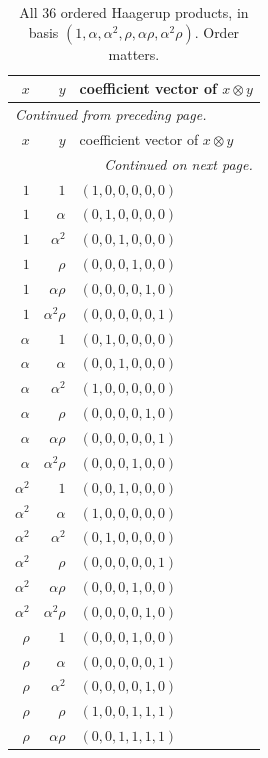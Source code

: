 \begingroup\small
\setlength{\tabcolsep}{5pt}
\begin{longtable}{rrl}
\caption{All 36 ordered Haagerup products, in basis $(1,\alpha,\alpha^2,\rho,\alpha\rho,\alpha^2\rho)$. Order matters.}\label{expphysics:h3-fusion}\\
\toprule
$x$ & $y$ & coefficient vector of $x\otimes y$\\
\midrule
\endfirsthead
\multicolumn{3}{l}{\small\itshape Continued from preceding page.}\\
\toprule
$x$ & $y$ & coefficient vector of $x\otimes y$\\
\midrule
\endhead
\midrule
\multicolumn{3}{r}{\small\itshape Continued on next page.}\\
\endfoot
\bottomrule
\endlastfoot
$1$ & $1$ & $(1,0,0,0,0,0)$\\
$1$ & $\alpha$ & $(0,1,0,0,0,0)$\\
$1$ & $\alpha^2$ & $(0,0,1,0,0,0)$\\
$1$ & $\rho$ & $(0,0,0,1,0,0)$\\
$1$ & $\alpha\rho$ & $(0,0,0,0,1,0)$\\
$1$ & $\alpha^2\rho$ & $(0,0,0,0,0,1)$\\
$\alpha$ & $1$ & $(0,1,0,0,0,0)$\\
$\alpha$ & $\alpha$ & $(0,0,1,0,0,0)$\\
$\alpha$ & $\alpha^2$ & $(1,0,0,0,0,0)$\\
$\alpha$ & $\rho$ & $(0,0,0,0,1,0)$\\
$\alpha$ & $\alpha\rho$ & $(0,0,0,0,0,1)$\\
$\alpha$ & $\alpha^2\rho$ & $(0,0,0,1,0,0)$\\
$\alpha^2$ & $1$ & $(0,0,1,0,0,0)$\\
$\alpha^2$ & $\alpha$ & $(1,0,0,0,0,0)$\\
$\alpha^2$ & $\alpha^2$ & $(0,1,0,0,0,0)$\\
$\alpha^2$ & $\rho$ & $(0,0,0,0,0,1)$\\
$\alpha^2$ & $\alpha\rho$ & $(0,0,0,1,0,0)$\\
$\alpha^2$ & $\alpha^2\rho$ & $(0,0,0,0,1,0)$\\
$\rho$ & $1$ & $(0,0,0,1,0,0)$\\
$\rho$ & $\alpha$ & $(0,0,0,0,0,1)$\\
$\rho$ & $\alpha^2$ & $(0,0,0,0,1,0)$\\
$\rho$ & $\rho$ & $(1,0,0,1,1,1)$\\
$\rho$ & $\alpha\rho$ & $(0,0,1,1,1,1)$\\

\end{longtable}
